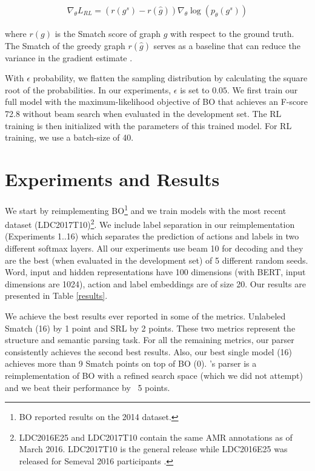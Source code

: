 \documentclass[11pt,a4paper]{article}
\begin{document}
\begin{align}
    \nabla_{\theta} L_{RL}=(r(g^s)-r(\hat{g})) \nabla_{\theta} \log(p_{\theta}(g^s)) 
\end{align}

where $r(g)$ is the Smatch score of graph $g$ with respect to the ground truth. The Smatch of the greedy graph $r(\hat{g})$ serves as a baseline that can reduce the variance in the gradient estimate \cite{williams1992simple}. 

With $\epsilon$ probability, we flatten the sampling distribution by calculating the square root of the probabilities. In our experiments, $\epsilon$ is set to $0.05$. We first train our full model with the  maximum-likelihood objective of BO that achieves an F-score 72.8 without beam search when evaluated in the development set. The RL training is then initialized with the parameters of this trained model. For RL training, we use a batch-size of 40. 

\section{Experiments and Results} \label{sec-results}

We start by reimplementing BO\footnote{BO reported results on the 2014 dataset.} and we train models with the most recent dataset (LDC2017T10)\footnote{LDC2016E25 and LDC2017T10 contain the same AMR annotations as of March 2016. LDC2017T10 is the general release while LDC2016E25 was released for Semeval 2016 participants \cite{may2016semeval}.}. We include label separation in our reimplementation (Experiments 1..16) which separates the prediction of actions and labels in two different softmax layers. All our experiments use beam 10 for decoding and they are the best (when evaluated in the development set) of 5 different random seeds. Word, input and hidden representations have 100 dimensions (with BERT, input dimensions are 1024), action and label embeddings are of size 20. Our results are presented in Table \ref{results}.

We achieve the best results ever reported in some of the metrics. Unlabeled Smatch (16) by 1 point and SRL by 2 points. These two metrics represent the structure and semantic parsing task. For all the remaining metrics, our parser consistently achieves the second best results. Also, our best single model (16) achieves more than 9 Smatch points on top of BO (0). 's parser is a reimplementation of BO with a refined search space (which we did not attempt) and we beat their performance by ~5 points. 
\end{document}
